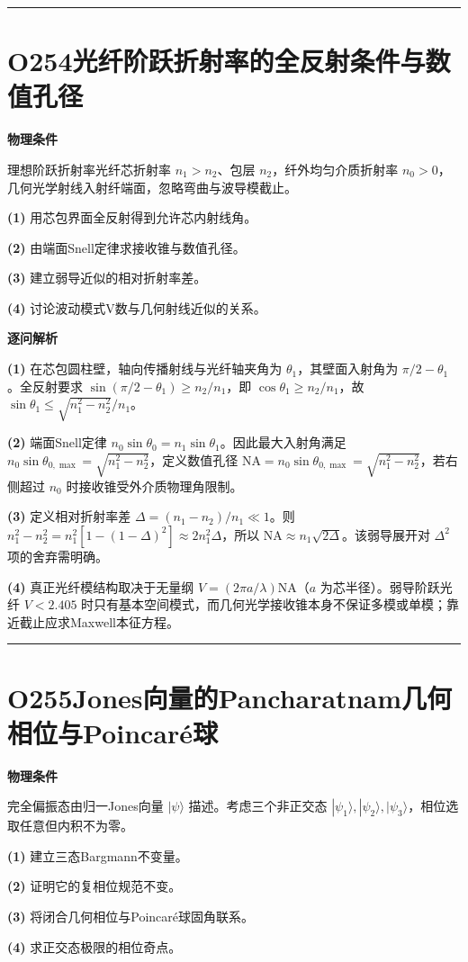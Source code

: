 \documentclass[UTF8,a4paper,11pt,oneside,openany]{ctexbook}
\begin{document}
\par\bigskip\hrule\bigskip
\section*{O254\quad 光纤阶跃折射率的全反射条件与数值孔径}
\textbf{物理条件}\par 理想阶跃折射率光纤芯折射率 \(n_1>n_2\)、包层 \(n_2\)，纤外均匀介质折射率 \(n_0>0\)，几何光学射线入射纤端面，忽略弯曲与波导模截止。
\par\noindent\textbf{(1)} 用芯包界面全反射得到允许芯内射线角。
\par\noindent\textbf{(2)} 由端面Snell定律求接收锥与数值孔径。
\par\noindent\textbf{(3)} 建立弱导近似的相对折射率差。
\par\noindent\textbf{(4)} 讨论波动模式V数与几何射线近似的关系。

\par\medskip\noindent\textbf{逐问解析}
\par\noindent\textbf{(1)} 在芯包圆柱壁，轴向传播射线与光纤轴夹角为 \(\theta_1\)，其壁面入射角为 \(\pi/2-\theta_1\)。全反射要求 \(\sin(\pi/2-\theta_1)\ge n_2/n_1\)，即 \(\cos\theta_1\ge n_2/n_1\)，故 \(\sin\theta_1\le\sqrt{n_1^2-n_2^2}/n_1\)。
\par\noindent\textbf{(2)} 端面Snell定律 \(n_0\sin\theta_0=n_1\sin\theta_1\)。因此最大入射角满足 \(n_0\sin\theta_{0,\max}=\sqrt{n_1^2-n_2^2}\)，定义数值孔径 \(\mathrm{NA}=n_0\sin\theta_{0,\max}=\sqrt{n_1^2-n_2^2}\)，若右侧超过 \(n_0\) 时接收锥受外介质物理角限制。
\par\noindent\textbf{(3)} 定义相对折射率差 \(\Delta=(n_1-n_2)/n_1\ll1\)。则 \(n_1^2-n_2^2=n_1^2[1-(1-\Delta)^2]\approx2n_1^2\Delta\)，所以 \(\mathrm{NA}\approx n_1\sqrt{2\Delta}\)。该弱导展开对 \(\Delta^2\) 项的舍弃需明确。
\par\noindent\textbf{(4)} 真正光纤模结构取决于无量纲 \(V=(2\pi a/\lambda)\mathrm{NA}\)（\(a\) 为芯半径）。弱导阶跃光纤 \(V<2.405\) 时只有基本空间模式，而几何光学接收锥本身不保证多模或单模；靠近截止应求Maxwell本征方程。

\par\bigskip\hrule\bigskip
\section*{O255\quad Jones向量的Pancharatnam几何相位与Poincaré球}
\textbf{物理条件}\par 完全偏振态由归一Jones向量 \(|\psi\rangle\) 描述。考虑三个非正交态 \(|\psi_1\rangle,|\psi_2\rangle,|\psi_3\rangle\)，相位选取任意但内积不为零。
\par\noindent\textbf{(1)} 建立三态Bargmann不变量。
\par\noindent\textbf{(2)} 证明它的复相位规范不变。
\par\noindent\textbf{(3)} 将闭合几何相位与Poincaré球固角联系。
\par\noindent\textbf{(4)} 求正交态极限的相位奇点。
\end{document}
